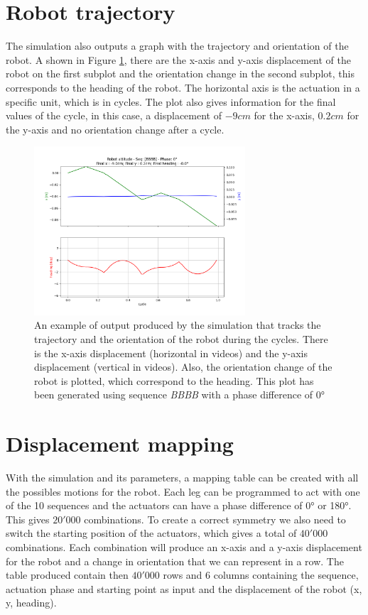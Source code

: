     \section{Robot trajectory}\label{sec:res_position}
        The simulation also outputs a graph with the trajectory and orientation of the robot. A shown in Figure \ref{fig:robot_position}, there are the x-axis and y-axis displacement of the robot on the first subplot and the orientation change in the second subplot, this corresponds to the heading of the robot. The horizontal axis is the actuation in a specific unit, which is in cycles. The plot also gives information for the final values of the cycle, in this case, a displacement of $-9cm$ for the x-axis, $0.2cm$ for the y-axis and no orientation change after a cycle.
        \begin{figure}[h]
            \centering
            \includegraphics[width=0.7\textwidth]{images/robot_position.png}
            \caption{An example of output produced by the simulation that tracks the trajectory and the orientation of the robot during the cycles. There is the x-axis displacement (horizontal in videos) and the y-axis displacement (vertical in videos). Also, the orientation change of the robot is plotted, which correspond to the heading. This plot has been generated using sequence \textit{BBBB} with a phase difference of $0$°}
            \label{fig:robot_position}
        \end{figure}
    
    \section{Displacement mapping}\label{sec:res_mapping}
        With the simulation and its parameters, a mapping table can be created with all the possibles motions for the robot. Each leg can be programmed to act with one of the 10 sequences and the actuators can have a phase difference of 0° or 180°. This gives $20'000$ combinations. To create a correct symmetry we also need to switch the starting position of the actuators, which gives a total of $40'000$ combinations. Each combination will produce an x-axis and a y-axis displacement for the robot and a change in orientation that we can represent in a row. The table produced contain then $40'000$ rows and $6$ columns containing the sequence, actuation phase and starting point as input and the displacement of the robot (x, y, heading).\\
        
